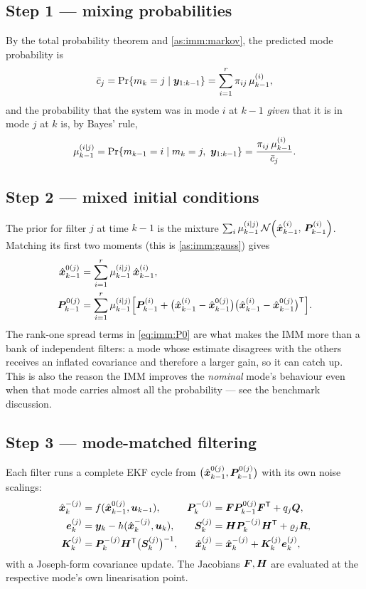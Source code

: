 \subsection{Step 1 --- mixing probabilities}
By the total probability theorem and \cref{as:imm:markov}, the predicted mode probability is
\begin{equation}
\bar c_j = \mathrm{Pr}\{m_k=j\mid\bm{y}_{1:k-1}\} = \sum_{i=1}^{r}\pi_{ij}\,\mu^{(i)}_{k-1},
\label{eq:imm:cbar}
\end{equation}
and the probability that the system was in mode $i$ at $k-1$ \emph{given} that it is in mode $j$ at
$k$ is, by Bayes' rule,
\begin{equation}
\mu^{(i|j)}_{k-1} = \mathrm{Pr}\{m_{k-1}=i\mid m_k=j,\ \bm{y}_{1:k-1}\} = \frac{\pi_{ij}\,\mu^{(i)}_{k-1}}{\bar c_j}.
\label{eq:imm:mix}
\end{equation}

\subsection{Step 2 --- mixed initial conditions}
The prior for filter $j$ at time $k-1$ is the mixture
$\sum_i \mu^{(i|j)}_{k-1}\,\mathcal{N}\!\left(\hat{\bm{x}}^{(i)}_{k-1},\,\bm{P}^{(i)}_{k-1}\right)$.  Matching its first two moments
(this is \cref{as:imm:gauss}) gives
\begin{align}
\hat{\bm{x}}^{0(j)}_{k-1} &= \sum_{i=1}^{r}\mu^{(i|j)}_{k-1}\,\hat{\bm{x}}^{(i)}_{k-1}, \label{eq:imm:x0}\\
\bm{P}^{0(j)}_{k-1} &= \sum_{i=1}^{r}\mu^{(i|j)}_{k-1}\Big[\bm{P}^{(i)}_{k-1}
   + \big(\hat{\bm{x}}^{(i)}_{k-1}-\hat{\bm{x}}^{0(j)}_{k-1}\big)\big(\hat{\bm{x}}^{(i)}_{k-1}-\hat{\bm{x}}^{0(j)}_{k-1}\big)^{\mathsf{T}}\Big].
\label{eq:imm:P0}
\end{align}
The rank-one spread terms in \eqref{eq:imm:P0} are what makes the IMM more than a bank of
independent filters: a mode whose estimate disagrees with the others receives an inflated
covariance and therefore a larger gain, so it can catch up.  This is also the reason the IMM
improves the \emph{nominal} mode's behaviour even when that mode carries almost all the
probability --- see the benchmark discussion.

\subsection{Step 3 --- mode-matched filtering}
Each filter runs a complete EKF cycle from $\big(\hat{\bm{x}}^{0(j)}_{k-1},\bm{P}^{0(j)}_{k-1}\big)$ with its
own noise scalings:
\begin{align}
\hat{\bm{x}}^{-(j)}_k &= f(\hat{\bm{x}}^{0(j)}_{k-1},\bm{u}_{k-1}), &
\bm{P}^{-(j)}_k &= \bm{F}\bm{P}^{0(j)}_{k-1}\bm{F}^{\mathsf{T}} + q_j\bm{Q}, \label{eq:imm:pred}\\
\bm{e}^{(j)}_k &= \bm{y}_k - h(\hat{\bm{x}}^{-(j)}_k,\bm{u}_k), &
\bm{S}^{(j)}_k &= \bm{H}\bm{P}^{-(j)}_k\bm{H}^{\mathsf{T}} + \varrho_j\bm{R}, \label{eq:imm:innov}\\
\bm{K}^{(j)}_k &= \bm{P}^{-(j)}_k\bm{H}^{\mathsf{T}}\big(\bm{S}^{(j)}_k\big)^{-1}, &
\hat{\bm{x}}^{(j)}_k &= \hat{\bm{x}}^{-(j)}_k + \bm{K}^{(j)}_k\bm{e}^{(j)}_k, \label{eq:imm:upd}
\end{align}
with a Joseph-form covariance update.  The Jacobians $\bm{F},\bm{H}$ are evaluated at the respective
mode's own linearisation point.

